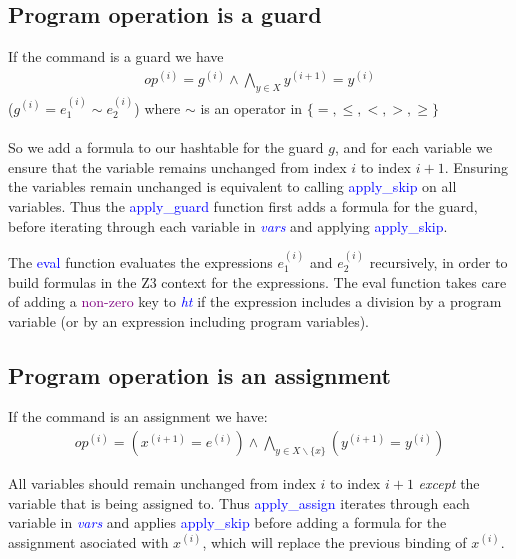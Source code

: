 \documentclass[letterpaper,12pt]{article}
\begin{document}
\subsection{Program operation is a guard}\label{guard}
If the command is a guard we have
\begin{align*}
op^{(i)} = g^{(i)} \wedge \bigwedge_{y \in X}y^{(i+1)} = y^{(i)}
\end{align*}
($ g^{(i)} = e_1^{(i)} \sim e_2^{(i)}$) where  $\sim$ is an operator in $ \{ = ,\leq, < , >, \geq \}$  

\paragraph{}
So we add a formula to our hashtable for the guard $g$, and for each variable we ensure that the variable remains unchanged from index $i$ to index $i+1$. 
Ensuring the variables remain unchanged is equivalent to calling \textcolor{blue}{apply\_skip} on all variables.
Thus the \textcolor{blue}{apply\_guard} function first adds a formula for the guard, before iterating through each variable in \textit{\textcolor{blue}{vars}}  and applying \textcolor{blue}{apply\_skip}.

The \textcolor{blue}{eval} function evaluates the expressions $e_1^{(i)}$ and $e_2^{(i)}$ recursively, in order to build formulas in the Z3 context for the expressions. The eval function takes care of adding a \textcolor{purple}{non-zero} key to \textit{\textcolor{blue}{ht}} if the expression includes a division by a program variable (or by an expression including program variables).

\subsection{Program operation is an assignment}\label{assign}

If the command is an assignment we have:
\begin{align*}
op^{(i)} = (x^{(i+1)} = e^{(i)}) \wedge \bigwedge_{y \in X\backslash \{x\} }(y^{(i+1)} = y^{(i)})
\end{align*}

All variables should remain unchanged from index $i$ to index $i+1$ \textit{except} the variable that is being assigned to. Thus \textcolor{blue}{apply\_assign} iterates through each variable in \textit{\textcolor{blue}{vars}} and applies \textcolor{blue}{apply\_skip} before adding a formula for the assignment asociated with $x^{(i)}$, which will replace the previous binding of $x^{(i)}$.
\end{document}
